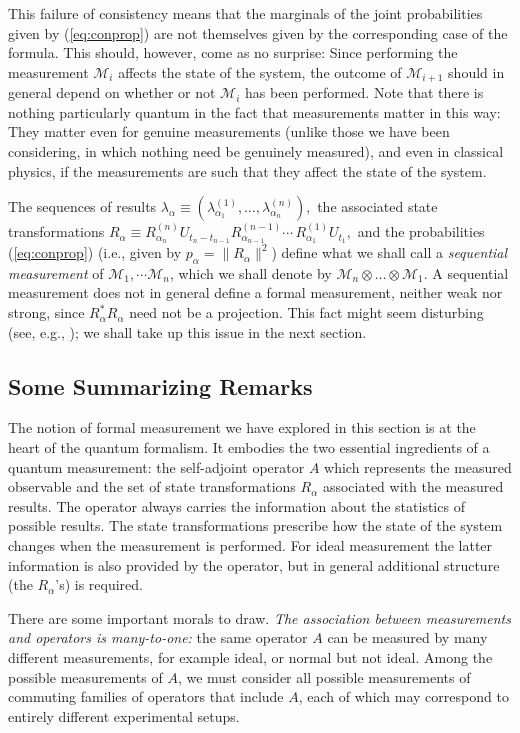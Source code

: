 \documentclass[12pt]{article}
\renewcommand{\a}{\alpha}
\newcommand{\Aa}{R_{\a}}
\newcommand{\M}{\mbox{$\mathcal{M}$}}
\newcommand{\norm}{\|}
\begin{document}
This failure of consistency means that the marginals of the joint
probabilities given by (\ref{eq:conprop}) are not themselves given by
the corresponding case of the formula. This should, however, come as
no surprise: Since performing the measurement $\M_{i}$ affects the
state of the system, the outcome of $\M_{i+1}$ should in general
depend on whether or not $\M_{i}$ has been performed.  Note that there
is nothing particularly quantum in the fact that measurements matter
in this way: They matter even for genuine measurements (unlike those
we have been considering, in which nothing need be genuinely
measured), and even in classical physics, if the measurements are such
that they affect the state of the system.


The sequences of results $
\lambda_{\alpha}\equiv(\lambda^{(1)}_{\alpha_{1}},
\ldots,\lambda^{(n)}_{\alpha_{n}}),$ the associated state
transformations $\Aa \equiv R^{(n)}_{\alpha_{n}} U_{t_n -t_{n-1}}
R^{(n-1)}_{\alpha_{n-1}} \cdots\,R^{(1)}_{\alpha_{1}} U_{t_1},$ and
the probabilities (\ref{eq:conprop}) (i.e., given by $p_\a = \norm
\Aa\norm^2$) define what we shall call a \emph{ sequential
   measurement} of $\M_1, \cdots\M_n$, which we shall denote by
$\M_{n}\otimes \ldots\otimes \M_{1}$.  A sequential measurement does
not in general define a formal measurement, neither weak nor strong,
since $R_{\alpha}^{\ast}R_{\alpha}$ need not be a projection. This
fact might seem disturbing (see, e.g., \cite{Dav76}); we shall take up
this issue in the next section.




\subsection{Some Summarizing Remarks}


The notion of formal measurement we have explored in this section is
at the heart of the quantum formalism.  It embodies the two essential
ingredients of a quantum measurement: the self-adjoint operator $A$
which represents the measured observable and the set of state
transformations $\Aa$ associated with the measured results.  The
operator always carries the information about the statistics of
possible results. The state transformations prescribe how the state of
the system changes when the measurement is performed. For ideal
measurement the latter information is also provided by the operator,
but in general additional structure (the $\Aa$'s) is required.

There are some important morals to draw.  \emph{The association
   between measurements and operators is many-to-one:} the same
operator $A$ can be measured by many different measurements, for
example ideal, or normal but not ideal. Among the possible
measurements of $A$, we must consider all possible measurements of
commuting families of operators that include $A$, each of which may
correspond to entirely different experimental setups.
\end{document}

